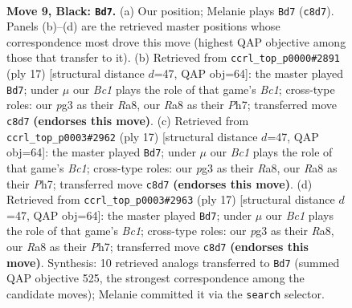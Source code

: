 \documentclass[11pt]{article}
\begin{document}
\clearpage

\begin{figure}[p]\centering
\begin{subfigure}{0.46\textwidth}\centering
\resizebox{\linewidth}{!}{%
\newchessgame
\chessboard[
  setfen={rnbq1rk1/1p2bppp/4pn2/p1p5/2PP3P/5NP1/P3PPB1/RNBQ1RK1 b - - 0 9},
  showmover=false,
  pgfstyle=straightmove, color=movearrow, markmove={c8-d7}
]}
\caption{}
\end{subfigure}\hfill
\begin{subfigure}{0.46\textwidth}\centering
\resizebox{\linewidth}{!}{%
\newchessgame
\chessboard[
  setfen={rnbq1rk1/pp2bppp/4pn2/8/2BP4/P1N2N2/1P3PPP/R1BQ1RK1 b - - 4 9},
  showmover=false,
  pgfstyle=straightmove, color=movearrow, markmove={c8-d7}
]}
\caption{}
\end{subfigure}
\\[4pt]
\begin{subfigure}{0.46\textwidth}\centering
\resizebox{\linewidth}{!}{%
\newchessgame
\chessboard[
  setfen={rnbq1rk1/pp2bppp/4pn2/8/2BP4/P1N2N2/1P3PPP/R1BQ1RK1 b - - 4 9},
  showmover=false,
  pgfstyle=straightmove, color=movearrow, markmove={c8-d7}
]}
\caption{}
\end{subfigure}\hfill
\begin{subfigure}{0.46\textwidth}\centering
\resizebox{\linewidth}{!}{%
\newchessgame
\chessboard[
  setfen={rnbq1rk1/pp2bppp/4pn2/8/2BP4/P1N2N2/1P3PPP/R1BQ1RK1 b - - 4 9},
  showmover=false,
  pgfstyle=straightmove, color=movearrow, markmove={c8-d7}
]}
\caption{}
\end{subfigure}
\caption{\textbf{Move 9, Black: \texttt{Bd7}.} (a) Our position; Melanie plays \texttt{Bd7} (\texttt{c8d7}). Panels (b)--(d) are the retrieved master positions whose correspondence most drove this move (highest QAP objective among those that transfer to it). (b) Retrieved from \texttt{ccrl\_top\_p0000\#2891} (ply 17) [structural distance $d$=47, QAP obj=64]: the master played \texttt{Bd7}; under $\mu$ our \emph{Bc1} plays the role of that game's \emph{Bc1}; cross-type roles: our \emph{p}g3 as their \emph{R}a8, our \emph{R}a8 as their \emph{P}h7; transferred move \texttt{c8d7} \textbf{(endorses this move)}. (c) Retrieved from \texttt{ccrl\_top\_p0003\#2962} (ply 17) [structural distance $d$=47, QAP obj=64]: the master played \texttt{Bd7}; under $\mu$ our \emph{Bc1} plays the role of that game's \emph{Bc1}; cross-type roles: our \emph{p}g3 as their \emph{R}a8, our \emph{R}a8 as their \emph{P}h7; transferred move \texttt{c8d7} \textbf{(endorses this move)}. (d) Retrieved from \texttt{ccrl\_top\_p0003\#2963} (ply 17) [structural distance $d$=47, QAP obj=64]: the master played \texttt{Bd7}; under $\mu$ our \emph{Bc1} plays the role of that game's \emph{Bc1}; cross-type roles: our \emph{p}g3 as their \emph{R}a8, our \emph{R}a8 as their \emph{P}h7; transferred move \texttt{c8d7} \textbf{(endorses this move)}. Synthesis: 10 retrieved analogs transferred to \texttt{Bd7} (summed QAP objective 525, the strongest correspondence among the candidate moves); Melanie committed it via the \texttt{search} selector.}
\label{fig:thought-m17}
\end{figure}
\end{document}
